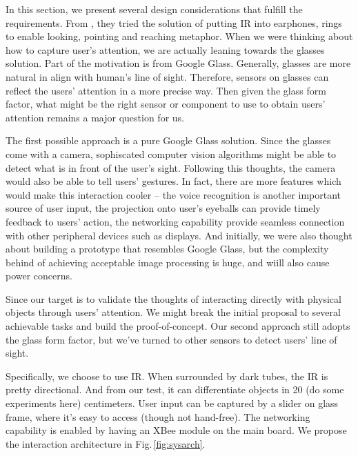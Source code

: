 In this section, we present several design considerations that fulfill the requirements. From \cite{Merrill:2007:ALP:1758156.1758158}, they tried the solution of putting IR into earphones, rings to enable looking, pointing and reaching metaphor. When we were thinking about how to capture user's attention, we are actually leaning towards the glasses solution. Part of the motivation is from Google Glass. Generally, glasses are more natural in align with human's line of sight. Therefore, sensors on glasses can reflect the users' attention in a more precise way. Then given the glass form factor, what might be the right sensor or component to use to obtain users' attention remains a major question for us.

The first possible approach is a pure Google Glass solution. Since the glasses come with a camera, sophiscated computer vision algorithms might be able to detect what is in front of the user's sight. Following this thoughts, the camera would also be able to tell users' gestures. In fact, there are more features which would make this interaction cooler -- the voice recognition is another important source of user input, the projection onto user's eyeballs can provide timely feedback to users' action, the networking capability provide seamless connection with other peripheral devices such as displays. And initially, we were also thought about building a prototype that resembles Google Glass, but the complexity behind of achieving acceptable image processing is huge, and wiill also cause power concerns.

Since our target is to validate the thoughts of interacting directly with physical objects through users' attention. We might break the initial proposal to several achievable tasks and build the proof-of-concept. Our second approach still adopts the glass form factor, but we've turned to other sensors to detect users' line of sight. 

Specifically, we choose to use IR. When surrounded by dark tubes, the IR is pretty directional. And from our test, it can differentiate objects in {\color{red} 20 (do some experiments here)} centimeters. User input can be captured by a slider on glass frame, where it's easy to access (though not hand-free). The networking capability is enabled by having an XBee module on the main board. We propose the interaction architecture in Fig.\,\ref{fig:sysarch}.

